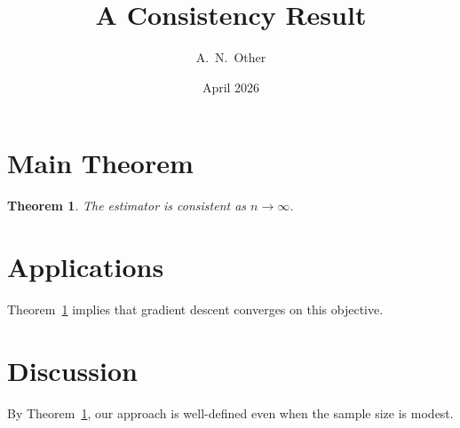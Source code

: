 \documentclass[11pt]{article}
\title{A Consistency Result}
\author{A.\ N.\ Other}
\date{April 2026}
\newtheorem{theorem}{Theorem}
\begin{document}
\maketitle

\section{Main Theorem}

\begin{theorem}\label{thm-main}
The estimator is consistent as $n \to \infty$.
\end{theorem}

\section{Applications}

Theorem~\ref{thm-main} implies that gradient descent converges on this objective.

\section{Discussion}

By Theorem~\ref{thm-main}, our approach is well-defined even when the sample size is modest.
\end{document}
